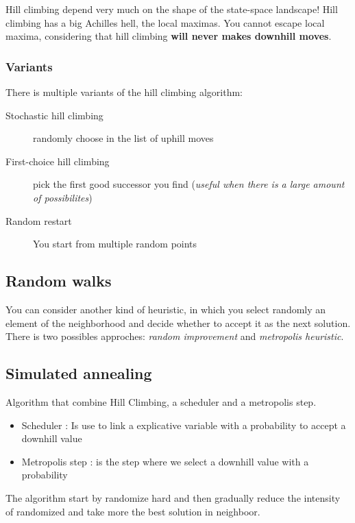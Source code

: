 Hill climbing depend  very  much on  the  shape  of  the state-space  landscape!  Hill
climbing has a  big Achilles hell, the local maximas.  You cannot escape
local maxima,  considering that  hill climbing \textbf{will  never makes
downhill moves}.

\subsubsection{Variants}

There is multiple variants of the hill climbing algorithm:
\begin{description}
    \item[Stochastic hill climbing] randomly choose in the list of uphill moves
    \item[First-choice hill climbing] pick the first good successor you find 
        (\textit{useful when there is a large amount of possibilites})
    \item[Random restart] You start from multiple random points
\end{description}


\subsection{Random walks}

You can consider another kind of heuristic, in which you select randomly
an  element of  the  neighborhood and  decide whether  to  accept it  as
the  next solution.  There  is two  possibles approches:  \textit{random
improvement}  and  \textit{metropolis heuristic}.

\subsection{Simulated annealing}

Algorithm that combine Hill Climbing, a scheduler and a metropolis step.
\begin{itemize}
    \item Scheduler : Is use to link a explicative variable  with a probability to accept a
        downhill value
    \item Metropolis step : is the step where we select a downhill value with a probability
\end{itemize}

The algorithm start by randomize hard and then gradually reduce the intensity of randomized
and take more the best solution in neighboor.

